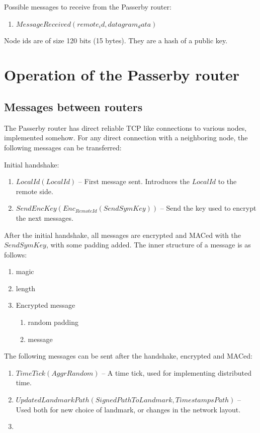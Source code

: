 \documentclass{amsart}
\theoremstyle{definition}
\theoremstyle{remark}
\numberwithin{equation}{section}
\begin{document}
Possible messages to receive from the Passerby router:
\begin{enumerate}
  \item $MessageReceived (remote_id, datagram_data)$
\end{enumerate}

Node ids are of size 120 bits (15 bytes). They are a hash of a public key.

\section{Operation of the Passerby router}

\subsection{Messages between routers}

The Passerby router has direct reliable TCP like connections to various nodes,
implemented somehow. For any direct connection with a neighboring node, the
following messages can be transferred:

Initial handshake:
\begin{enumerate}
  \item $LocalId(LocalId)$
      -- First message sent. Introduces the $LocalId$ to the remote side.
  \item $SendEncKey(Enc_{RemoteId}(SendSymKey))$
      -- Send the key used to encrypt the next messages.
\end{enumerate}

After the initial handshake, all messages are encrypted and MACed with the
$SendSymKey$, with some padding added. The inner structure of a message is as
follows:

\begin{enumerate}
  \item magic
  \item length
  \item Encrypted message
    \begin{enumerate}
      \item random padding
      \item message
    \end{enumerate}
\end{enumerate}

The following messages can be sent after the handshake, encrypted and MACed:

\begin{enumerate}
  \item $TimeTick(AggrRandom)$
      -- A time tick, used for implementing distributed time.
  \item $UpdatedLandmarkPath(SignedPathToLandmark, TimestampsPath)$
      -- Used both for new choice of landmark, or changes in the network layout.
  \item 
\end{enumerate}
\end{document}
